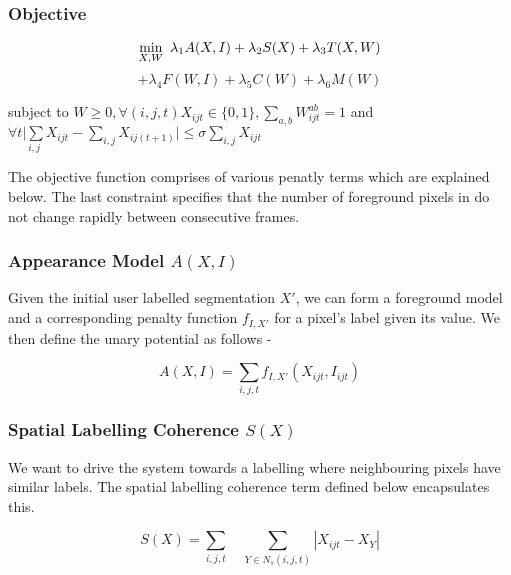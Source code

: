 \documentclass{article}
\begin{document}
\subsubsection*{Objective}

\begin{equation}
\underset{X,W}{\min}\enskip\lambda_{1}A(X,I)+\lambda_{2}S(X)+\lambda_{3}T(X,W)
\end{equation}
\[
+\lambda_{4}F(W,I) +\lambda_{5}C(W)+\lambda_{6}M(W)
\]


\begin{center}
subject to $W\geq0,\forall(i,j,t)X_{ijt}\in\{0,1\},\underset{a,b}{\sum}W_{ijt}^{ab}=1$
and $\forall t\underset{i,j}{|\sum}X_{ijt}-\underset{i,j}{\sum}X_{ij(t+1)}|\leq\sigma\underset{i,j}{\sum}X_{ijt}$
\par\end{center}

\noindent The objective function comprises of various penatly terms
which are explained below. The last constraint specifies that the
number of foreground pixels in do not change rapidly between consecutive
frames.


\subsubsection*{Appearance Model $A(X,I)$}

Given the initial user labelled segmentation $X'$, we can form a
foreground model and a corresponding penalty function $f_{I,X'}$
for a pixel's label given its value. We then define the unary potential
as follows -

\begin{equation}
A(X,I)=\underset{i,j,t}{\sum}f_{I,X'}(X_{ijt},I_{ijt})
\end{equation}



\subsubsection*{Spatial Labelling Coherence $S(X)$}

We want to drive the system towards a labelling where neighbouring
pixels have similar labels. The spatial labelling coherence term defined
below encapsulates this.

\begin{equation}
S(X)=\underset{i,j,t}{\sum}\quad\underset{Y\in N_{s}(i,j,t)}{\sum}|X_{ijt}-X_{Y}|
\end{equation}
\end{document}
